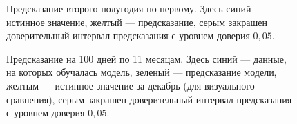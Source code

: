 \begin{figure}[h]
        \noindent{}
        \caption{Предсказание второго полугодия по первому. Здесь синий --- истинное значение, желтый --- предсказание, серым закрашен доверительный интервал предсказания с уровнем доверия $0,\!05$.}
        \label{img:pred1}
\end{figure}

\begin{figure}[h]
        \noindent{}
        \caption{Предсказание на 100 дней по 11 месяцам. Здесь синий --- данные, на которых обучалась модель, зеленый --- предсказание модели, желтым --- истинное значение за декабрь (для визуального сравнения), серым закрашен доверительный интервал предсказания с уровнем доверия $0,\!05$.}
        \label{img:pred2}
\end{figure}